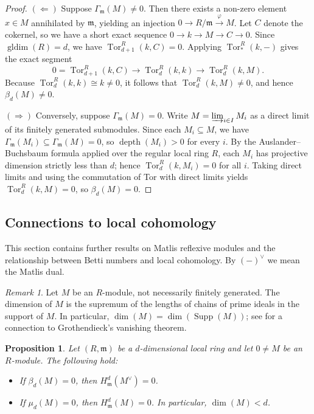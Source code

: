 \documentclass[11pt,a4paper]{amsart}
\numberwithin{equation}{section}
\newtheorem{proposition}[theorem]{Proposition}
\theoremstyle{definition}
\theoremstyle{remark}
\newtheorem{remark}[theorem]{Remark}
\newcommand{\depth}{\operatorname{depth}}
\begin{document}
\begin{proof}
	\((\Leftarrow)\) Suppose \(\Gamma_{\mathfrak{m}}(M) \neq 0\). Then there exists a non-zero element \(x \in M\) annihilated by \(\mathfrak{m}\), yielding an injection \(0 \to R/\mathfrak{m} \xrightarrow{\varphi} M\). Let \(C\) denote the cokernel, so we have a short exact sequence \(0 \to k \to M \to C \to 0\). Since \(\operatorname{gldim}(R) = d\), we have \(\operatorname{Tor}_{d+1}^R(k,C) = 0\). Applying \(\operatorname{Tor}_*^R(k,-)\) gives the exact segment
	\[
	0 = \operatorname{Tor}_{d+1}^R(k,C) \longrightarrow \operatorname{Tor}_d^R(k,k) \longrightarrow \operatorname{Tor}_d^R(k,M).
	\]
	Because \(\operatorname{Tor}_d^R(k,k) \cong k \neq 0\), it follows that \(\operatorname{Tor}_d^R(k,M) \neq 0\), and hence \(\beta_d(M) \neq 0\).
	
	\((\Rightarrow)\) Conversely, suppose \(\Gamma_{\mathfrak{m}}(M) = 0\). Write \(M = \varinjlim_{i \in I} M_i\) as a direct limit of its finitely generated submodules. Since each \(M_i \subseteq M\), we have \(\Gamma_{\mathfrak{m}}(M_i) \subseteq \Gamma_{\mathfrak{m}}(M) = 0\), so \(\depth(M_i) > 0\) for every \(i\). By the Auslander--Buchsbaum formula applied over the regular local ring \(R\), each \(M_i\) has projective dimension strictly less than \(d\); hence \(\operatorname{Tor}_d^R(k,M_i) = 0\) for all \(i\). Taking direct limits and using the commutation of Tor with direct limits yields \(\operatorname{Tor}_d^R(k,M) = 0\), so \(\beta_d(M) = 0\).
\end{proof}
\subsection{Connections to local cohomology}
This section contains further results on Matlis reflexive modules and the relationship between Betti numbers and local cohomology. By $(-)^\vee$ we mean the Matlis dual.


\begin{remark}
	Let $M$ be an $R$-module, not necessarily finitely generated. The dimension of $M$ is the supremum of the lengths of chains of prime ideals in the support of $M$. In particular, $\dim(M) = \dim(\operatorname{Supp}(M))$; see \cite[6.1.1 Reminder]{BSh} for a connection to Grothendieck's vanishing theorem.
\end{remark}

\begin{proposition}\label{72}
	Let $(R,\mathfrak{m})$ be a $d$-dimensional local ring and let $0 \neq M$ be an $R$-module. The following hold:
	\begin{itemize}
		\item[(i)] If $\beta_d(M) = 0$, then $H^d_{\mathfrak{m}}(M^\vee) = 0$.
		\item[(ii)] If $\mu_d(M) = 0$, then $H^d_{\mathfrak{m}}(M) = 0$. In particular, $\dim(M) < d$.
	\end{itemize}
\end{proposition}
\end{document}
